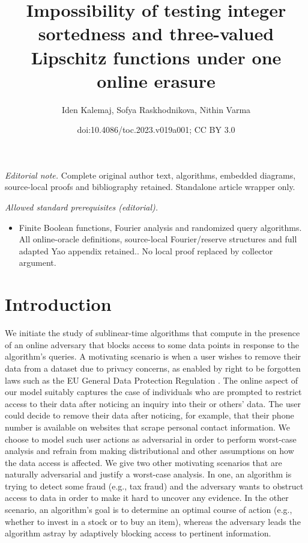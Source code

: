 \documentclass[11pt]{article}
\title{Impossibility of testing integer sortedness and three-valued Lipschitz functions under one online erasure}
\author{Iden Kalemaj, Sofya Raskhodnikova, Nithin Varma}
\date{doi:10.4086/toc.2023.v019a001; CC BY 3.0}
\numberwithin{equation}{section}
\theoremstyle{definition}
\theoremstyle{plain}
\begin{document}
\maketitle
\noindent\textit{Editorial note.} Complete original author text, algorithms, embedded diagrams, source-local proofs and bibliography retained. Standalone article wrapper only.\par\medskip
\noindent\textit{Allowed standard prerequisites (editorial).}\begin{itemize}
\item Finite Boolean functions, Fourier analysis and randomized query algorithms. All online-oracle definitions, source-local Fourier/reserve structures and full adapted Yao appendix retained.. No local proof replaced by collector argument.
\end{itemize}\medskip
\section{Introduction}

	   
We initiate the study of sublinear-time algorithms that compute in the presence of an online adversary that blocks access to some data points in response to the algorithm's queries. A motivating scenario is when a user wishes to remove their data from a dataset due to privacy concerns, as enabled by right to be forgotten laws such as the EU General Data Protection Regulation \cite{Mantelero13}. 
The online aspect of our model suitably captures the case of individuals who are prompted to restrict access to their data after noticing an inquiry into their or others' data. The user could decide to remove their data after noticing, for example, that their phone number is available on websites that scrape personal contact information.
We choose to model such user actions as adversarial in order to perform worst-case analysis and refrain from making distributional and other assumptions on how the data access is affected. We give two other motivating scenarios that are naturally adversarial and justify a worst-case analysis. In one, an  algorithm is trying to detect some fraud (e.g., tax fraud) and the adversary wants to obstruct access to data in order to make it hard to uncover any evidence. In the other scenario, an algorithm's goal is to determine an optimal course of action (e.g., whether to invest in a stock or to buy an item), whereas the adversary leads the algorithm astray by adaptively blocking access to pertinent information. 
\end{document}
